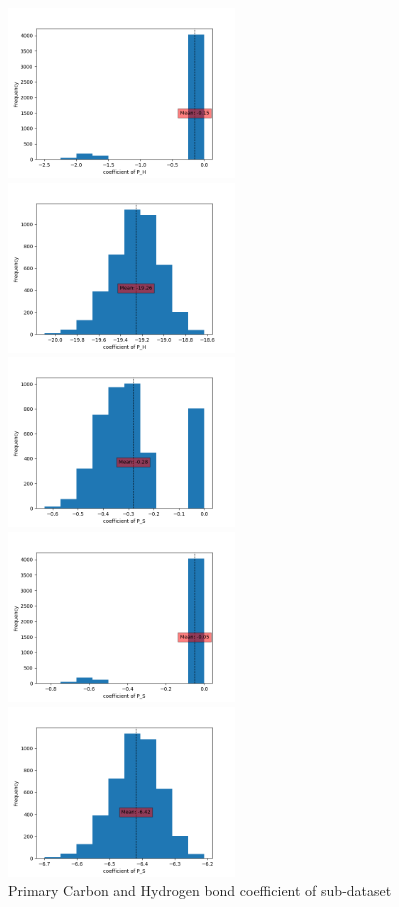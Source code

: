 \documentclass[preprint,12pt]{elsarticle}
\begin{document}
\begin{figure}	[H]
\begin{multicols}{3}
				    		\includegraphics[width=6cm]{PH1.png}\par
				    		\includegraphics[width=6cm]{PH2.png}\par
				    	\end{multicols}
				    	\caption{Primary Carbon and Hydrogen bond coefficient of sub-dataset}	  		  
				    	\begin{multicols}{3}
				    		\includegraphics[width=6cm]{PS0.png}\par
				    		\includegraphics[width=6cm]{PS1.png}\par
				    		\includegraphics[width=6cm]{PS2.png}\par

\end{multicols}
\end{figure}
\end{document}
